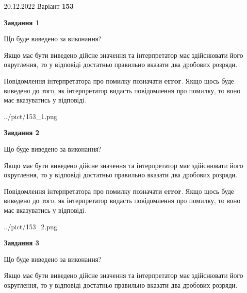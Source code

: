 \documentclass[12pt, ukrainian]{article}
\begin{document}
{20.12.2022 Варіант \No \textbf { 153 }\par}
{
\begin {Large}

{\begin {center}\textbf{Завдання 1}\end {center}}\par
Що буде виведено за виконання? \par

Якщо має бути виведено дійсне значення та інтерпретатор має здійснювати його округлення, 
то у відповіді достатньо правильно вказати два дробових розряди.

Повідомлення інтерпретатора про помилку позначати \textbf{error}.
Якщо щось буде виведено до того, як інтерпретатор видасть повідомлення про помилку, 
то воно має вказуватись у відповіді. \par

\begin{center}
	{../pict/153_1.png}
\end{center}
\newpage

{\begin {center}\textbf{Завдання 2}\end {center}}\par
Що буде виведено за виконання? \par

Якщо має бути виведено дійсне значення та інтерпретатор має здійснювати його округлення, 
то у відповіді достатньо правильно вказати два дробових розряди.

Повідомлення інтерпретатора про помилку позначати \textbf{error}.
Якщо щось буде виведено до того, як інтерпретатор видасть повідомлення про помилку, 
то воно має вказуватись у відповіді. \par

\begin{center}
	{../pict/153_2.png}
\end{center}
\newpage

{\begin {center}\textbf{Завдання 3}\end {center}}\par
Що буде виведено за виконання? \par

Якщо має бути виведено дійсне значення та інтерпретатор має здійснювати його округлення, 
то у відповіді достатньо правильно вказати два дробових розряди.


\end{Large}}
\end{document}

